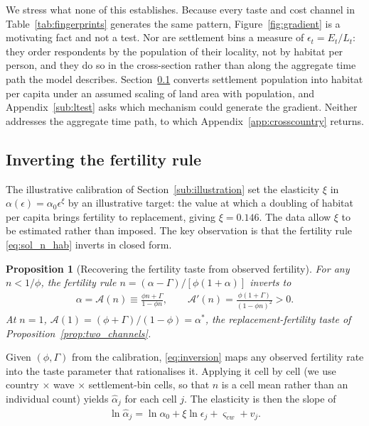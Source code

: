\documentclass[11pt]{article}
\newtheorem{proposition}{Proposition}
\begin{document}
We stress what none of this establishes. Because every taste and cost channel in Table~\ref{tab:fingerprints} generates the same pattern,
Figure~\ref{fig:gradient} is a motivating fact and not a test. Nor are settlement bins a measure of
$\epsilon_t=E_t/L_t$: they order respondents by the population of their locality, not by habitat per
person, and they do so in the cross-section rather than along the aggregate time path the model
describes. Section~\ref{sub:xi} converts settlement population into habitat per capita under an
assumed scaling of land area with population, and Appendix~\ref{sub:ltest} asks which mechanism could
generate the gradient. Neither addresses the aggregate time path, to which
Appendix~\ref{app:crosscountry} returns.

\subsection{Inverting the fertility rule}
\label{sub:xi}

The illustrative calibration of Section~\ref{sub:illustration} set the elasticity $\xi$ in
$\alpha(\epsilon)=\alpha_0\epsilon^{\xi}$ by an illustrative target: the value at which a doubling of
habitat per capita brings fertility to replacement, giving $\xi=0.146$. The data allow $\xi$ to be
estimated rather than imposed. The key observation is that the fertility rule
\eqref{eq:sol_n_hab} inverts in closed form.

\begin{proposition}[Recovering the fertility taste from observed fertility]
\label{prop:inversion}
For any $n<1/\phi$, the fertility rule $n=(\alpha-\Gamma)/[\phi(1+\alpha)]$ inverts to
\begin{align}
\alpha=\mathcal{A}(n)\equiv\frac{\phi n+\Gamma}{1-\phi n},
\qquad
\mathcal{A}'(n)=\frac{\phi(1+\Gamma)}{(1-\phi n)^{2}}>0 .
\label{eq:inversion}
\end{align}
At $n=1$, $\mathcal{A}(1)=(\phi+\Gamma)/(1-\phi)=\alpha^{\ast}$, the replacement-fertility taste of
Proposition~\ref{prop:two_channels}.
\end{proposition}

Given $(\phi,\Gamma)$ from the calibration, \eqref{eq:inversion} maps any observed fertility rate
into the taste parameter that rationalises it. Applying it cell by cell (we use country
$\times$ wave $\times$ settlement-bin cells, so that $n$ is a cell mean rather than an individual
count) yields $\hat\alpha_{j}$ for each cell $j$. The elasticity is then the slope of
\begin{align}
\ln \hat\alpha_{j}=\ln\alpha_0+\xi \ln \epsilon_{j}+\varsigma_{cw}+v_{j}.
\label{eq:xi_spec}
\end{align}
\end{document}
